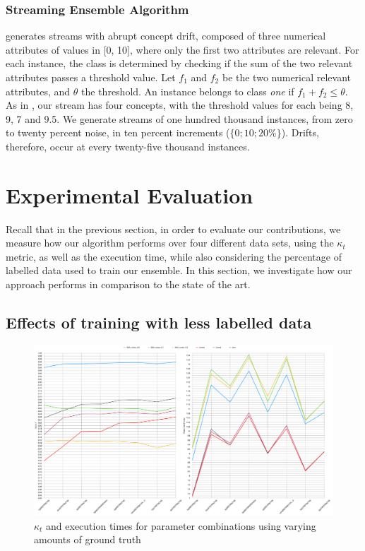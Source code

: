 \documentclass[runningheads]{llncs}
\begin{document}
\subsubsection{Streaming Ensemble Algorithm}
generates streams with abrupt concept drift, composed of three numerical attributes of values in [0, 10], where only the first two attributes are relevant. For each instance, the class is determined by checking if the sum of the two relevant attributes passes a threshold value. Let $f_1$ and $f_2$ be the two numerical relevant attributes, and $\theta$ the threshold. An instance belongs to class \textit{one} if $f_1 + f_2 \leq \theta$. As in \cite{street2001streaming}, our stream has four concepts, with the threshold values for each being 8, 9, 7 and 9.5. We generate streams of one hundred thousand instances, from zero to twenty percent noise, in ten percent increments ($\{0; 10; 20\%\}$). Drifts, therefore, occur at every twenty-five thousand instances.

\section{Experimental Evaluation\label{section:evaluation_discussion}}

Recall that in the previous section, in order to evaluate our contributions, we measure how our algorithm performs over four different data sets, using the $\kappa_t$ metric, as well as the execution time, while also considering the percentage of labelled data used to train our ensemble.
In this section, we investigate how our approach performs in comparison to the state of the art.

\subsection{Effects of training with less labelled data}
\begin{figure}
  \includegraphics[width=\linewidth]{./images/chapter5/ground_truth_both}
\caption{\label{fig:ground_truth_drop}$\kappa_t$ and execution times for parameter combinations using varying amounts of ground truth}
\end{figure}
\end{document}
